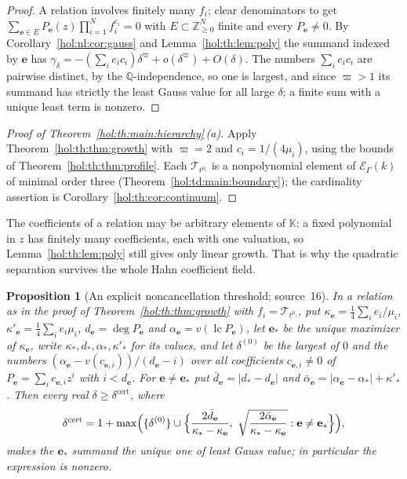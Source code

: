 \documentclass[11pt]{article}
\numberwithin{equation}{section}
\newtheorem{proposition}[theorem]{Proposition}
\theoremstyle{definition}
\theoremstyle{remark}
\newcommand{\Q}{\mathbb Q}
\newcommand{\Z}{\mathbb Z}
\newcommand{\lc}{\operatorname{lc}}
\newcommand{\abs}[1]{\lvert#1\rvert}
\newcommand{\KK}{\mathbb K}
\newcommand{\EK}{\mathcal E_\Gamma(k)}
\begin{document}
\begin{proof}
A relation involves finitely many $f_i$; clear denominators to get
$\sum_{\mathbf e\in E}P_{\mathbf e}(z)\prod_{i=1}^Nf_i^{e_i}=0$ with $E\subset
\Z_{\ge0}^N$ finite and every $P_{\mathbf e}\ne0$. By
Corollary~\ref{hol:nl:cor:gauss} and Lemma~\ref{hol:th:lem:poly} the summand
indexed by $\mathbf e$ has $\gamma_\delta=-(\sum_ie_ic_i)\delta^\varpi+
o(\delta^\varpi)+O(\delta)$. The numbers $\sum_ie_ic_i$ are pairwise distinct,
by the $\Q$-independence, so one is largest, and since $\varpi>1$ its summand
has strictly the least Gauss value for all large $\delta$; a finite sum with a
unique least term is nonzero.
\end{proof}

\begin{proof}[Proof of Theorem~\ref{hol:th:main:hierarchy}\,\textup{(a)}]
Apply Theorem~\ref{hol:th:thm:growth} with $\varpi=2$ and $c_i=1/(4\mu_i)$,
using the bounds of Theorem~\ref{hol:th:thm:profile}. Each
$\mathcal T_{t^{\mu_i}}$ is a nonpolynomial element of $\EK$ of minimal order
three (Theorem~\ref{hol:td:main:boundary}); the cardinality assertion is
Corollary~\ref{hol:th:cor:continuum}.
\end{proof}

The coefficients of a relation may be arbitrary elements of $\KK$: a fixed
polynomial in $z$ has finitely many coefficients, each with one valuation, so
Lemma~\ref{hol:th:lem:poly} still gives only linear growth. That is why the
quadratic separation survives the whole Hahn coefficient field.

\begin{proposition}[An explicit noncancellation threshold; source~16]
\label{hol:th:prop:threshold}
In a relation as in the proof of Theorem~\ref{hol:th:thm:growth} with
$f_i=\mathcal T_{t^{\mu_i}}$, put $\kappa_{\mathbf e}=\frac14\sum_ie_i/\mu_i$,
$\kappa'_{\mathbf e}=\frac14\sum_ie_i\mu_i$, $d_{\mathbf e}=\deg P_{\mathbf e}$
and $\alpha_{\mathbf e}=v(\lc P_{\mathbf e})$, let $\mathbf e_*$ be the unique
maximizer of $\kappa_{\mathbf e}$, write $\kappa_*,d_*,\alpha_*,\kappa'_*$ for
its values, and let $\delta^{(0)}$ be the largest of $0$ and the numbers
$(\alpha_{\mathbf e}-v(c_{\mathbf e,i}))/(d_{\mathbf e}-i)$ over all
coefficients $c_{\mathbf e,i}\ne0$ of $P_{\mathbf e}=\sum_ic_{\mathbf e,i}z^i$
with $i<d_{\mathbf e}$. For $\mathbf e\ne\mathbf e_*$ put
$\bar d_{\mathbf e}=\abs{d_*-d_{\mathbf e}}$ and
$\bar\alpha_{\mathbf e}=\abs{\alpha_{\mathbf e}-\alpha_*}+\kappa'_*$. Then
every real $\delta\ge\delta^{\mathrm{cert}}$, where
\[
 \delta^{\mathrm{cert}}=1+\max\Bigl(\{\delta^{(0)}\}\cup\Bigl\{
 \frac{2\bar d_{\mathbf e}}{\kappa_*-\kappa_{\mathbf e}},\
 \sqrt{\frac{2\bar\alpha_{\mathbf e}}{\kappa_*-\kappa_{\mathbf e}}}:
 \mathbf e\ne\mathbf e_*\Bigr\}\Bigr),
\]
makes the $\mathbf e_*$ summand the unique one of least Gauss value; in
particular the expression is nonzero.
\end{proposition}
\end{document}
